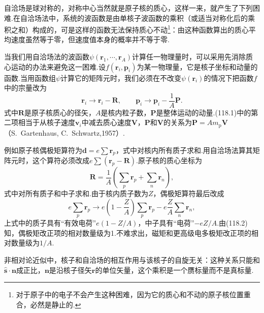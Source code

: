 自洽场是球对称的，对称中心当然就是原子核的质心，这样一来，就产生了下列困难.在自洽场法中，系统的波函数是由单核子波函数的乘积（或适当对称化后的乘积之和）构成的，可是这样的函数无法保持质心不动\footnote{对于原子中的电子不会产生这种困难，因为它的质心和不动的原子核位置重合，必然是静止的.}：由这种函数算出的质心平均速度虽然等于零，但速度值本身的概率并不等于零.

当我们用自洽场法的波函数$\psi(\boldsymbol{r}_1,\cdots,\boldsymbol{r}_A)$计算任一物理量时，可以采用先消除质心运动的办法来避免这一困难.设$f(\boldsymbol{r}_i,\boldsymbol{p}_i)$为某一物理量，它是核子坐标和动量的函数.当用函数组$\psi$计算它的矩阵元时，我们必须在不改变$\psi(\boldsymbol{r}_i)$的情况下把函数$f$中的宗量改为
\begin{equation}
  \boldsymbol{r}_i\to\boldsymbol{r}_i-\boldsymbol{R},\qquad
  \boldsymbol{p}_i\to\boldsymbol{p}_i-\frac{1}{A}\boldsymbol{P}.
\end{equation}
式中$\boldsymbol{R}$是原子核质心的径矢，$A$是核内粒子数，$\boldsymbol{P}$是整体运动的动量.(118.1)中的第二项相当于从核子速度$\boldsymbol{v}_i$中减去质心速度$\boldsymbol{V}$，$\boldsymbol{P}$和$\boldsymbol{V}$的关系为$\boldsymbol{P}=Am_\mathrm{p}\boldsymbol{V}$（S.~Gartenhaus, C.~Schwartz,1957）.

例如原子核偶极矩算符为$\boldsymbol{d}=e\sum\boldsymbol{r}_p$，式中对核内所有质子求和.用自洽场法算其矩阵元时，这个算符必须改成$e\sum(\boldsymbol{r}_p-\boldsymbol{R})$.原子核的质心坐标为
\begin{equation*}
  \boldsymbol{R}=\frac{1}{A}\left(\sum_p\boldsymbol{r}_p+\sum_n\boldsymbol{r}_n\right),
\end{equation*}
式中对所有质子和中子求和.由于核内质子数为$Z$，偶极矩算符最后改成
\begin{equation}
  e\sum_p\boldsymbol{r}_p\to e\left(1-\frac{Z}{A}\right)\sum_p\boldsymbol{r}_p
  -e\frac{Z}{A}\sum_n\boldsymbol{r}_n,
\end{equation}
上式中的质子具有“有效电荷”$e(1-Z/A)$，中子具有“电荷”$-eZ/A$.由(118.2)知，偶极矩改正项的相对数量级为1.不难求出，磁矩和更高级电多极矩改正项的相对数量级为$1/A$.

非相对论近似中，核子和自洽场的相互作用与该核子的自旋无关：这种关系只能和$\hat{\boldsymbol{s}}\cdot\boldsymbol{n}$成正比，$\boldsymbol{n}$是沿核子径矢$\boldsymbol{r}$的单位矢量，这个乘积是一个赝标量而不是真标量.

